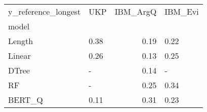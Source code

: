 \begin{tabular}{llrl}
\toprule
y\_reference\_longest &   UKP &  IBM\_ArgQ & IBM\_Evi \\
model  &       &           &         \\
\midrule
Length &  0.38 &      0.19 &    0.22 \\
Linear &  0.26 &      0.13 &    0.25 \\
DTree  &     - &      0.14 &       - \\
RF     &     - &      0.25 &    0.34 \\
BERT\_Q &  0.11 &      0.31 &    0.23 \\
\bottomrule
\end{tabular}
